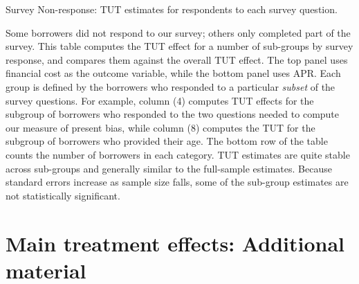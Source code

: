 \begin{landscape}
\begin{table}[H]
\caption{Survey Non-response: TUT estimates for respondents to each survey question.}
\label{TUT_cond_survet}
\begin{center}
\scriptsize{}
\end{center}
\scriptsize

Some borrowers did not respond to our survey; others only completed part of the survey.
This table computes the TUT effect for a number of sub-groups by survey response, and compares them against the overall TUT effect.
The top panel uses financial cost as the outcome variable, while the bottom panel uses APR.
Each group is defined by the borrowers who responded to a particular \emph{subset} of the survey questions. 
For example, column (4) computes TUT effects for the subgroup of borrowers who responded to the two questions needed to compute our measure of present bias, while column (8) computes the TUT for the subgroup of borrowers who provided their age.
The bottom row of the table counts the number of borrowers in each category.
TUT estimates are quite stable across sub-groups and generally similar to the full-sample estimates.
Because standard errors increase as sample size falls, some of the sub-group estimates are not statistically significant.
\end{table}
\end{landscape}



\newpage


\section{ Main treatment effects: Additional material}

